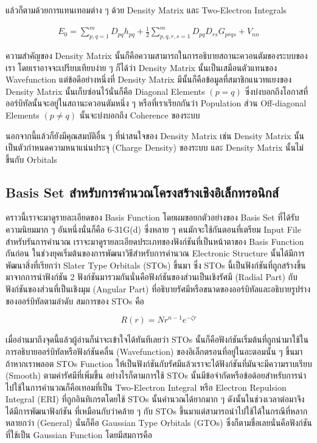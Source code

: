 \noindent แล้วก็ตามด้วยการแทนเทอมต่าง ๆ ด้วย Density Matrix และ Two-Electron Integrals

\begin{equation}
    \begin{aligned}
        E_0
        =
        \sum_{p, q=1}^m D_{p q} h_{p q}
        + \frac{1}{2} \sum_{p, q, r, s=1}^m D_{p q} D_{r s} G_{p r q s}+V_{n n}
    \end{aligned}
\end{equation}

ความสำคัญของ Density Matrix นั้นก็คือความสามารถในการอธิบายสถานะควอนตัมของระบบของเรา โดยเราอาจจะเปรียบเทียบง่าย ๆ ก็ได้ว่า
Density Matrix นั้นเป็นเสมือนตัวแทนของ Wavefunction แต่ข้อดีอย่างหนึ่งที่ Density Matrix มีนั้นก็คือข้อมูลที่สมาชิกแนวทแยงของ
Density Matrix นั้นเก็บซ่อนไว้นั่นก็คือ Diagonal Elements $(p = q)$ ซึ่งบ่งบอกถึงโอกาสที่ออร์บิทัลนั้นจะอยู่ในสถานะควอนตัมหนึ่ง ๆ
หรือที่เราเรียกกันว่า Population ส่วน Off-diagonal Elements $(p \neq q)$ นั้นจะบ่งบอกถึง Coherence ของระบบ

นอกจากนี้แล้วก็ยังมีคุณสมบัติอื่น ๆ ที่น่าสนใจของ Density Matrix เช่น Density Matrix นั้นเป็นตัวกำหนดความหนาแน่นประจุ (Charge
Density) ของระบบ และ Density Matrix นั้นไม่ขึ้นกับ Orbitals

\subsection{Basis Set สำหรับการคำนวณโครงสร้างเชิงอิเล็กทรอนิกส์}

คราวนี้เราจะมาดูรายละเอียดของ Basis Function โดยผมขอยกตัวอย่างของ Basis Set ที่ได้รับความนิยมมาก ๆ อันหนึ่งนั่นก็คือ 6-31G(d)
ซึ่งหลาย ๆ คนมักจะใช้กันตอนที่เตรียม Input File สำหรับรันการคำนวณ เราจะมาดูรายละเอียดประเภทของฟังก์ชันที่เป็นหน้าตาของ Basis Function
กันก่อน ในช่วงยุคเริ่มต้นของการพัฒนาวิธีสำหรับการคำนวณ Electronic Structure นั้นได้มีการพัฒนาสิ่งที่เรียกว่า Slater Type Orbitals
(STOs) ขึ้นมา ซึ่ง STOs นี้เป็นฟังก์ชันที่ถูกสร้างขึ้นมาจากการนำฟังก์ชัน 2 ฟังก์ชันมารวมกันนั่นคือฟังก์ชันของส่วนเป็นเชิงรัศมี (Radial Part)
กับฟังก์ชันของส่วนที่เป็นเชิงมุม (Angular Part) ที่อธิบายรัศมีหรือขนาดของออร์บิทัลและอธิบายรูปร่างของออร์บิทัลตามลำดับ สมการของ STOs คือ

\begin{equation}
    \label{eq:sto}
    R(r) = N r^{n - 1} e^{-\zeta r}
\end{equation}

เมื่ออ่านมาถึงจุดนี้แล้วผู้อ่านก็น่าจะเข้าใจได้ทันทีเลยว่า STOs นั้นก็คือฟังก์ชันเริ่มต้นที่ถูกนำมาใช้ในการอธิบายออร์บิทัลหรือฟังก์ชันคลื่น (Wavefunction)
ของอิเล็กตรอนที่อยู่ในอะตอมนั้น ๆ ขึ้นมา ถ้าหากเราพลอต STOs Function ให้เป็นฟังก์ชันกับรัศมีแล้วเราจะได้ฟังก์ชันที่มันจะมีความราบเรียบ (Smooth)
ตามค่ารัศมีที่เพิ่มขึ้น อย่างไรก็ตามการใช้ STOs นั้นมีข้อจำกัดหรือข้อด้อยสำหรับการนำไปใช้ในการคำนวณก็คือเทอมที่เป็น Two-Electron Integral
หรือ Electron Repulsion Integral (ERI) ที่ถูกอินทิเกรตโดยใช้ STOs นั้นคำนวณได้ยากมาก ๆ ดังนั้นในช่วงเวลาต่อมาจึงได้มีการพัฒนาฟังก์ชัน%
ที่เหมือนกับว่าคล้าย ๆ กับ STOs ขึ้นมาแต่สามารถนำไปใช้ได้ในกรณีที่หลากหลายกว่า (General) นั่นก็คือ Gaussian Type Orbitals (GTOs)
ซึ่งก็ตามชื่อเลยนั่นคือฟังก์ชันที่ใช้เป็น Gaussian Function โดยมีสมการคือ

